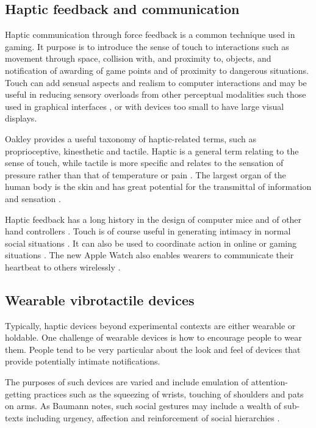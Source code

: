 \documentclass[a4paper, twocolumn]{article}
\begin{document}
\subsection{Haptic feedback and communication}
Haptic communication through force feedback is a common technique used in gaming. It purpose is to introduce the sense of touch to interactions such as movement through space, collision with, and proximity to, objects, and notification of awarding of game points and of proximity to dangerous situations. Touch can add sensual aspects and realism to computer interactions and may be useful in reducing sensory overloads from other perceptual modalities such those used in graphical interfaces \cite{oakley2000putting}, or with devices too small to have large visual displays.

Oakley provides a useful taxonomy of haptic-related terms, such as proprioceptive, kinesthetic and tactile. Haptic is a general term relating to the sense of touch, while tactile is more specific and relates to the sensation of pressure rather than that of temperature or pain \cite{oakley2000putting}. The largest organ of the human body is the skin and has great potential for the transmittal of information and sensation \cite{lindeman2006wearable} \cite{brewster2004tactons}. 

Haptic feedback has a long history in the design of computer mice and of other hand controllers \cite{yang2005novel}. Touch is of course useful in generating intimacy in normal social situations \cite{bronner1982haptic}. It can also be used to coordinate action in online or gaming situations \cite{ho1998experiment}. The new Apple Watch also enables wearers to communicate their heartbeat to others wirelessly \cite{johnson2014literature}. 

\subsection{Wearable vibrotactile devices}
Typically, haptic devices beyond experimental contexts are either wearable or holdable. One challenge of wearable devices is how to encourage people to wear them. People tend to be very particular about the look and feel of devices that provide potentially intimate notifications. 

The purposes of such devices are varied and include emulation of attention-getting practices such as the squeezing of wrists, touching of shoulders and pats on arms. As Baumann notes, such social gestures may include a wealth of sub-texts including urgency, affection and reinforcement of social hierarchies \cite{baumann2010emulating}.
\end{document}
